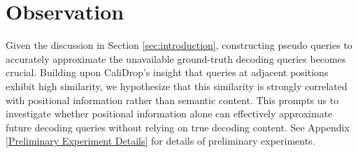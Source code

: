\section{Observation}



Given the discussion in Section \ref{sec:introduction}, constructing pseudo queries to accurately approximate the unavailable ground-truth decoding queries becomes crucial. Building upon CaliDrop's \citep{calidrop} insight that queries at adjacent positions exhibit high similarity, we hypothesize that this similarity is strongly correlated with positional information rather than semantic content. This prompts us to investigate whether positional information alone can effectively approximate future decoding queries without relying on true decoding content. See Appendix \ref{Preliminary Experiment Details} for details of preliminary experiments.

% 

